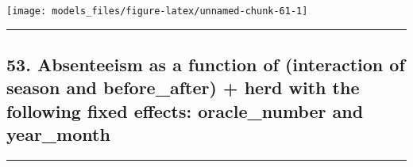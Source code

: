 \documentclass[]{article}
\begin{document}
\begin{center}\texttt{[image: models\_files/figure-latex/unnamed-chunk-61-1]} \end{center}

\newpage

\begin{center}\rule{0.5\linewidth}{\linethickness}\end{center}

\subsection{53. Absenteeism as a function of (interaction of season and
before\_after) + herd with the following fixed effects: oracle\_number
and
year\_month}\label{absenteeism-as-a-function-of-interaction-of-season-and-before_after-herd-with-the-following-fixed-effects-oracle_number-and-year_month}

\begin{center}\rule{0.5\linewidth}{\linethickness}\end{center}
\end{document}
